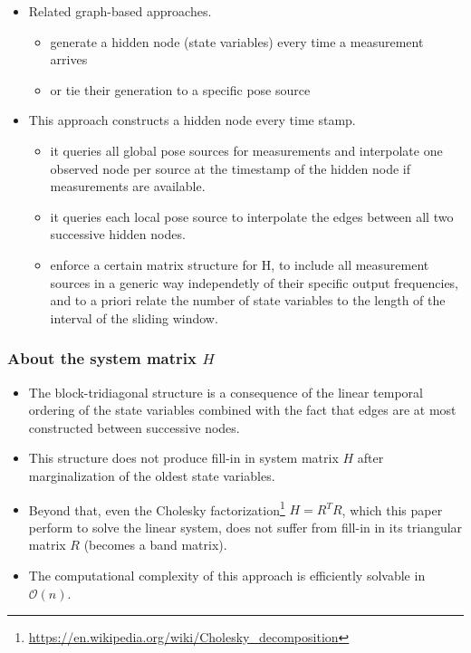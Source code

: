 \documentclass[letterpaper,10pt]{article}
\begin{document}
\begin{itemize}
	\item Related graph-based approaches.
	\begin{itemize}
		\item generate a hidden node (state variables) every time a measurement arrives
		\item or tie their generation to a specific pose source
	\end{itemize}
	\item This approach constructs a hidden node every time stamp.
	\begin{itemize}
		\item it queries all global pose sources for measurements and interpolate one observed node per source at the timestamp of the hidden node if measurements are available.
		\item it queries each local pose source to interpolate the edges between all two successive hidden nodes.
		\item enforce a certain matrix structure for H, to include all measurement sources in a generic way independetly of their specific output frequencies, and to a priori relate the number of state variables to the length of the interval of the sliding window.
	\end{itemize}
\end{itemize}

\subsubsection{About the system matrix $H$}

\begin{itemize}
	\item The block-tridiagonal structure is a consequence of the linear temporal ordering of the state variables combined with the fact that edges are at most constructed between successive nodes.
	\item This structure does not produce fill-in in system matrix $H$ after marginalization of the oldest state variables.
	\item Beyond that, even the Cholesky factorization\footnote{\url{https://en.wikipedia.org/wiki/Cholesky_decomposition}} $H=R^TR$, which this paper perform to solve the linear system, does not suffer from fill-in in its triangular matrix $R$ (becomes a band matrix).
	\item The computational complexity of this approach is efficiently solvable in $\mathcal{O}(n)$.
\end{itemize}
\end{document}
